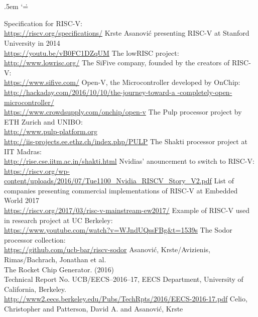 \documentclass[journal,a4paper]{IEEEtran}
\makeatletter
\renewenvironment{thebibliography}[1]{%
	\section*{\textsc{\refname}}%
	\normalfont\footnotesize\labelsep .5em\relax
	\renewcommand\theenumiv{\arabic{enumiv}}\let\p@enumiv\@empty
	\list{\@biblabel{\theenumiv}}{\@bibNote\settowidth\labelwidth{\@biblabel{#1}}%
	\leftmargin\labelwidth \advance\leftmargin\labelsep
	\usecounter{enumiv}}%
	\sloppy \clubpenalty\@M \widowpenalty\clubpenalty
	\sfcode`\.=\@m
}{%
	\def\@noitemerr{\@latex@warning{Empty `thebibliography' environment}}%
	\endlist
}
\makeatother
\begin{document}
\begin{thebibliography}{1}
		Specification for RISC-V:\\
		\url{https://riscv.org/specifications/}
		Krste Asanović presenting RISC-V at Stanford University in 2014\\
		\url{https://youtu.be/vB0FC1DZqUM}
		The lowRISC project:\\
		\url{http://www.lowrisc.org/}
		The SiFive company, founded by the creators of RISC-V:\\
		\url{https://www.sifive.com/}
		Open-V, the Microcontroller developed by OnChip:\\
		\url{http://hackaday.com/2016/10/10/the-journey-toward-a -completely-open-microcontroller/}\\
		\url{https://www.crowdsupply.com/onchip/open-v}
		The Pulp processor project by ETH Zurich and UNIBO:\\
		\url{http://www.pulp-platform.org}\\
		\url{http://iis-projects.ee.ethz.ch/index.php/PULP}
		The Shakti processor project at IIT Madras:\\
		\url{http://rise.cse.iitm.ac.in/shakti.html}
		Nvidias' anouncement to switch to RISC-V:\\
		\url{https://riscv.org/wp-content/uploads/2016/07/Tue1100_Nvidia_RISCV_Story_V2.pdf}
		List of companies presenting commercial implementations of \mbox{RISC-V} at Embedded World 2017\\
		\url{https://riscv.org/2017/03/risc-v-mainstream-ew2017/}
		Example of RISC-V used in research project at UC Berkeley:\\
		\url{https://www.youtube.com/watch?v=WJndUQssFBg&t=1539s}
		The Sodor processor collection:\\
		\url{https://github.com/ucb-bar/riscv-sodor}
		Asanović, Krste/Avizienis, Rimas/Bachrach, Jonathan et al.\\
		The Rocket Chip Generator. (2016)\\
		Technical Report No. UCB/EECS--2016--17, EECS Department, University of California, Berkeley.\\
		\url{http://www2.eecs.berkeley.edu/Pubs/TechRpts/2016/EECS-2016-17.pdf}
		Celio, Christopher and Patterson, David A. and Asanović, Krste\\

\end{thebibliography}
\end{document}
